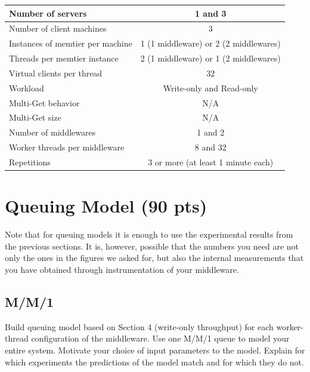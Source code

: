 \documentclass[11pt,a4paper]{article}
\begin{document}
\begin{center}
	\scriptsize{
		\begin{tabular}{|l|c|}
			\hline Number of servers                & 1 and 3                                     \\ 
			\hline Number of client machines        & 3                                           \\ 
			\hline Instances of memtier per machine & 1 (1 middleware) or 2 (2 middlewares) \\ 
			\hline Threads per memtier instance     & 2 (1 middleware) or 1 (2 middlewares)   \\
			\hline Virtual clients per thread       &  32                                     \\ 
			\hline Workload                         & Write-only and Read-only\\
			\hline Multi-Get behavior               & N/A                                         \\
			\hline Multi-Get size                   & N/A                                         \\
			\hline Number of middlewares            & 1 and 2                                     \\
			\hline Worker threads per middleware    & 8 and 32                                    \\
			\hline Repetitions                      & 3 or more (at least 1 minute each)                                   \\ 
			\hline 
		\end{tabular}
	} 
\end{center}

\section{Queuing Model (90 pts)}

Note that for queuing models it is enough to use the experimental results from the previous sections. It is, however, possible that the numbers you need are not only the ones in the figures we asked for, but also the internal measurements that you have obtained through instrumentation of your middleware.

\subsection{M/M/1}

Build queuing model based on Section 4 (write-only throughput) for each worker-thread configuration of the middleware. Use one M/M/1 queue to model your entire system. Motivate your choice of input parameters to the model. Explain for which experiments the predictions of the model match and for which they do not.
\end{document}
